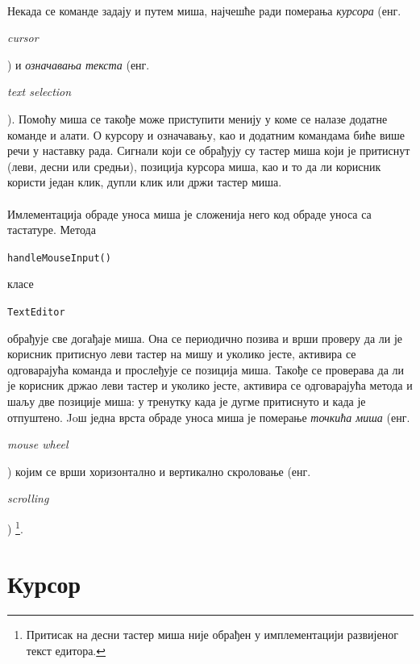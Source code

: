 \documentclass[12pt,oneside]{memoir}
\begin{document}
\paragraph{} 
Некада се команде задају и путем миша, најчешће ради померања \emph{курсора} 
(енг. \begin{latinica}\textit{cursor}\end{latinica}) и \emph{означавања текста}
(енг. \begin{latinica}\textit{text selection}\end{latinica}). Помоћу миша се такође 
може приступити менију у коме се налазе додатне команде и алати.
О курсору и означавању, као и додатним командама биће више речи у наставку рада.
Сигнали који се обрађују су тастер миша који је притиснут (леви, десни или средњи),
позиција курсора миша, као и то да ли корисник користи један клик, дупли клик или
држи тастер миша.

\paragraph{}
Имлементација обраде уноса миша је сложенија него код обраде уноса са тастатуре. Метода
\begin{latinica}\verb|handleMouseInput()|\end{latinica}
класе \begin{latinica}\verb|TextEditor|\end{latinica} обрађује све догађаје
миша. Она се периодично позива и врши проверу да ли је корисник притиснуо леви тастер на 
мишу и уколико јесте, активира се одговарајућа команда и прослеђује се позиција миша. 
Такође се проверава да ли је корисник држао леви тастер и уколико јесте, активира се одговарајућа метода и шаљу две позиције миша: у тренутку када је дугме притиснуто и када је отпуштено. Joш једна врста обраде уноса миша је померање \emph{точкића миша} (енг. \begin{latinica}\textit{mouse wheel}\end{latinica}) којим се врши хоризонтално и вертикално скроловање (енг. \begin{latinica}\textit{scrolling}\end{latinica}) \footnote{Притисак на десни тастер миша није обрађен у имплементацији развијеног текст едитора.}.


\section{Курсор} \label{cursor}
\end{document}
